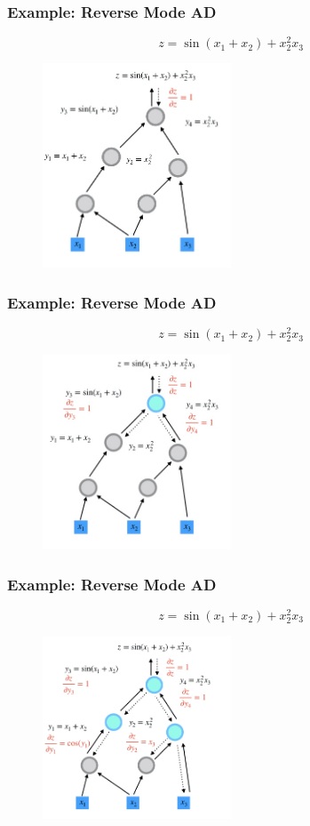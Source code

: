 \documentclass{beamer}
\begin{document}
\begin{frame}
\frametitle{Example: Reverse Mode AD}	
$$z=\sin(x_1+x_2) + x_2^2x_3$$
\begin{figure}[hbt]
\centering
  \includegraphics[width=0.5\textwidth]{figures/bd1}
\end{figure}

  
\end{frame}

\begin{frame}
\frametitle{Example: Reverse Mode AD}	
$$z=\sin(x_1+x_2) + x_2^2x_3$$
\begin{figure}[hbt]
\centering
  \includegraphics[width=0.5\textwidth]{figures/bd2}
\end{figure}
\end{frame}


\begin{frame}
\frametitle{Example: Reverse Mode AD}	
$$z=\sin(x_1+x_2) + x_2^2x_3$$
\begin{figure}[hbt]
\centering
  \includegraphics[width=0.5\textwidth]{figures/bd3}
\end{figure}
\end{frame}
\end{document}
